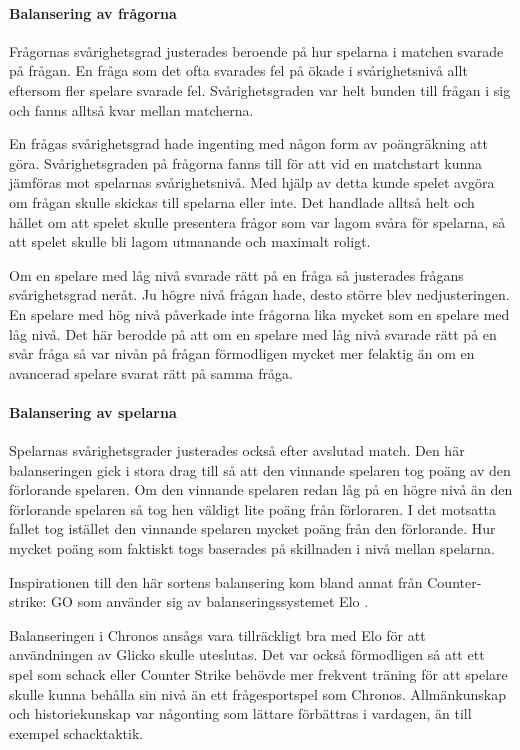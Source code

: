 \documentclass[a4paper, 11pt]{article}
\begin{document}
\paragraph{Balansering av frågorna}

Frågornas svårighetsgrad justerades beroende på hur spelarna i matchen svarade på frågan. En fråga som det ofta svarades fel på ökade i svårighetsnivå allt eftersom fler spelare svarade fel. Svårighetsgraden var helt bunden till frågan i sig och fanns alltså kvar mellan matcherna.

En frågas svårighetsgrad hade ingenting med någon form av poängräkning att göra. Svårighetsgraden på frågorna fanns till för att vid en matchstart kunna jämföras mot spelarnas svårighetsnivå. Med hjälp av detta kunde spelet avgöra om frågan skulle skickas till spelarna eller inte. Det handlade alltså helt och hållet om att spelet skulle presentera frågor som var lagom svåra för spelarna, så att spelet skulle bli lagom utmanande och maximalt roligt.

Om en spelare med låg nivå svarade rätt på en fråga så justerades frågans svårighetsgrad neråt. Ju högre nivå frågan hade, desto större blev nedjusteringen. En spelare med hög nivå påverkade inte frågorna lika mycket som en spelare med låg nivå. Det här berodde på att om en spelare med låg nivå svarade rätt på en svår fråga så var nivån på frågan förmodligen mycket mer felaktig än om en avancerad spelare svarat rätt på samma fråga. 

\paragraph{Balansering av spelarna}

Spelarnas svårighetsgrader justerades också efter avslutad match. Den här balanseringen gick i stora drag till så att den vinnande spelaren tog poäng av den förlorande spelaren. Om den vinnande spelaren redan låg på en högre nivå än den förlorande spelaren så tog hen väldigt lite poäng från förloraren. I det motsatta fallet tog istället den vinnande spelaren mycket poäng från den förlorande. Hur mycket poäng som faktiskt togs baserades på skillnaden i nivå mellan spelarna. 

Inspirationen till den här sortens balansering kom bland annat från Counter-strike: GO \cite{cs} som använder sig av balanseringssystemet Elo \cite{elo}. 

Balanseringen i Chronos ansågs vara tillräckligt bra med Elo för att användningen av Glicko skulle uteslutas. Det var också förmodligen så att ett spel som schack eller Counter Strike behövde mer frekvent träning för att spelare skulle kunna behålla sin nivå än ett frågesportspel som Chronos. Allmänkunskap och historiekunskap var någonting som lättare förbättras i vardagen, än till exempel schacktaktik. 
\end{document}
